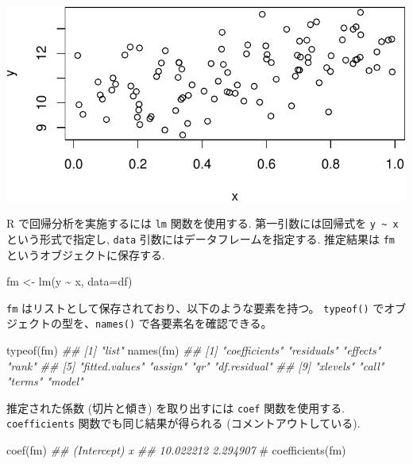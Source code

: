 \documentclass[
  letterpaper,
  xelatex,
  ja=standard, xelatex]{bxjsbook}
\newenvironment{Shaded}{\begin{snugshade}}{\end{snugshade}}
\newcommand{\AttributeTok}[1]{\textcolor[rgb]{0.40,0.45,0.13}{#1}}
\newcommand{\CommentTok}[1]{\textcolor[rgb]{0.37,0.37,0.37}{#1}}
\newcommand{\DocumentationTok}[1]{\textcolor[rgb]{0.37,0.37,0.37}{\textit{#1}}}
\newcommand{\FunctionTok}[1]{\textcolor[rgb]{0.28,0.35,0.67}{#1}}
\newcommand{\NormalTok}[1]{\textcolor[rgb]{0.00,0.23,0.31}{#1}}
\newcommand{\OtherTok}[1]{\textcolor[rgb]{0.00,0.23,0.31}{#1}}
\newcommand{\SpecialCharTok}[1]{\textcolor[rgb]{0.37,0.37,0.37}{#1}}
\begin{document}
\includegraphics{07-regression1_files/figure-pdf/unnamed-chunk-3-1.pdf}

R で回帰分析を実施するには \texttt{lm} 関数を使用する.
第一引数には回帰式を \texttt{y\ \textasciitilde{}\ x}
という形式で指定し, \texttt{data} 引数にはデータフレームを指定する.
推定結果は \texttt{fm} というオブジェクトに保存する.

\begin{Shaded}
\begin{Highlighting}[]
\NormalTok{fm }\OtherTok{\textless{}{-}} \FunctionTok{lm}\NormalTok{(y }\SpecialCharTok{\textasciitilde{}}\NormalTok{ x, }\AttributeTok{data=}\NormalTok{df)}
\end{Highlighting}
\end{Shaded}

\texttt{fm} はリストとして保存されており、以下のような要素を持つ。
\texttt{typeof()} でオブジェクトの型を、\texttt{names()}
で各要素名を確認できる。

\begin{Shaded}
\begin{Highlighting}[]
\FunctionTok{typeof}\NormalTok{(fm)}
\DocumentationTok{\#\# [1] "list"}
\FunctionTok{names}\NormalTok{(fm)}
\DocumentationTok{\#\#  [1] "coefficients"  "residuals"     "effects"       "rank"         }
\DocumentationTok{\#\#  [5] "fitted.values" "assign"        "qr"            "df.residual"  }
\DocumentationTok{\#\#  [9] "xlevels"       "call"          "terms"         "model"}
\end{Highlighting}
\end{Shaded}

推定された係数 (切片と傾き) を取り出すには \texttt{coef} 関数を使用する.
\texttt{coefficients} 関数でも同じ結果が得られる
(コメントアウトしている).

\begin{Shaded}
\begin{Highlighting}[]
\FunctionTok{coef}\NormalTok{(fm)}
\DocumentationTok{\#\# (Intercept)           x }
\DocumentationTok{\#\#   10.022212    2.294907}
\CommentTok{\# coefficients(fm)}
\end{Highlighting}
\end{Shaded}
\end{document}
